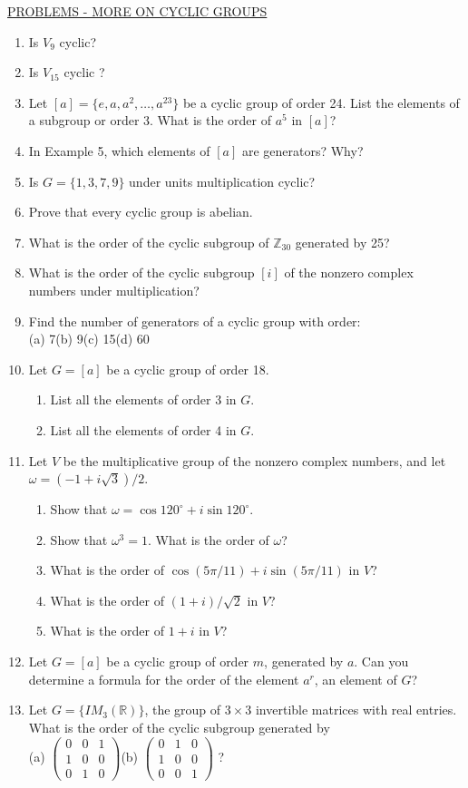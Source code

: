 \documentclass[12pt]{book}
\theoremstyle{definition}
\def\Z{\mathbb{Z}}
\begin{document}
\underline{PROBLEMS - MORE ON CYCLIC GROUPS}
\begin{enumerate}
\item Is $ V_9 $ cyclic?
\item Is $ V_{15} $ cyclic ?
\item Let $ [a]=\{e,a,a^2,\dots, a^{23}\} $ be a cyclic group of order 24. List the elements of a subgroup or order 3. What is the order of $ a^5 $ in $ [a] $?
\item In Example 5, which elements of $[a]$ are generators?  Why?
\item Is $G=\{1,3,7,9\}$ under units multiplication cyclic?
\item Prove that every cyclic group is abelian.
\item What is the order of the cyclic subgroup of $\Z_{30}$ generated by 25?
\item What is the order of the cyclic subgroup $[i]$ of the nonzero complex numbers under multiplication?
\item Find the number of generators of a cyclic group with order:\\
(a) 7\qquad(b) 9\qquad(c) 15\qquad(d) 60
\item Let $G=[a]$ be a cyclic group of order 18.
\begin{enumerate}
\item List all the elements of order 3 in $G$.
\item List all the elements of order 4 in $G$.
\end{enumerate}
\item Let $V$ be the multiplicative group of the nonzero complex numbers, and let $\omega=(-1+i\sqrt3)/2$.
\begin{enumerate}
\item Show that $\omega=\cos120^\circ+i\sin120^\circ$.
\item Show that $\omega^3=1$.  What is the order of $\omega$?
\item What is the order of $\cos(5\pi/11) + i \sin(5\pi/11)$ in $V$?
\item What is the order of $(1+i)/\sqrt2$ in $V$?
\item What is the order of $1+i$ in $V$?
\end{enumerate}
\item Let $ G=[a] $ be a cyclic group of order $ m $, generated by $ a $. Can you determine a formula for the order of the element $ a^r $, an element of $ G $?
\item Let $ G=\{IM_3(\mathbb{R})\} $, the group of $ 3\times 3 $ invertible matrices with real entries. What is the order of the cyclic subgroup generated by\\[.1in]
(a) $\begin{pmatrix} 
	0 & 0 & 1 \\
	1 & 0 & 0 \\
	0 & 1 & 0
\end{pmatrix} $\qquad (b) $\begin{pmatrix}
	0 & 1 & 0 \\
	1 & 0 & 0 \\
	0 & 0 & 1
\end{pmatrix}$ ? 


\end{enumerate}
\end{document}
